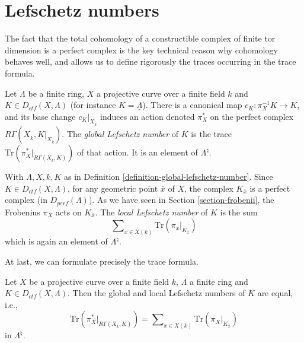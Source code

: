 \section{Lefschetz numbers}
\label{section-lefschetz-numbers}

\noindent
The fact that the total cohomology of a constructible complex of finite tor
dimension is a perfect complex is the key technical reason why cohomology
behaves well, and allows us to define rigorously the traces occurring in the
trace formula.

\begin{definition}
\label{definition-global-lefschetz-number}
Let $\Lambda$ be a finite ring, $X$ a projective curve over a finite field $k$
and $K \in D_{ctf}(X, \Lambda)$ (for instance $K = \underline\Lambda$).
There is a canonical map $c_K : \pi_X^{-1}K \to K$, and its base change
$c_K|_{X_{\bar k}}$ induces an action denoted $\pi_X^*$ on the perfect
complex $R\Gamma(X_{\bar k}, K|_{X_{\bar k}})$. The
{\it global Lefschetz number} of $K$ is the trace
$\text{Tr}(\pi_X^* |_{R\Gamma(X_{\bar k}, K)})$ of that action.
It is an element of $\Lambda^\natural$.
\end{definition}

\begin{definition}
\label{definition-local-lefschetz-number}
With $\Lambda, X, k, K$ as in
Definition \ref{definition-global-lefschetz-number}.
Since $K\in D_{ctf}(X, \Lambda)$, for any geometric point $\bar x$ of $X$,
the complex $K_{\bar x}$ is a perfect complex (in $D_{perf}(\Lambda)$). As we
have seen in Section \ref{section-frobenii}, the Frobenius $\pi_X$ acts on
$K_{\bar x}$. The {\it local Lefschetz number} of $K$ is the sum
$$
\sum\nolimits_{x\in X(k)} \text{Tr}(\pi_x |_{K_{\overline{x}}})
$$
which is again an element of $\Lambda^\natural$.
\end{definition}

\noindent
At last, we can formulate precisely the trace formula.

\begin{theorem}
\label{theorem-trace}
Let $X$ be a projective curve over a finite field $k$, $\Lambda$ a finite ring
and $K \in D_{ctf}(X, \Lambda)$. Then the global and local Lefschetz numbers
of $K$ are equal, i.e.,
\begin{equation}
\label{equation-trace-formula}
\text{Tr}(\pi^*_X |_{R\Gamma(X_{\bar k}, K)})
=
\sum\nolimits_{x\in X(k)} \text{Tr}(\pi_X |_{K_{\bar x}})
\end{equation}
in $\Lambda^\natural$.
\end{theorem}

